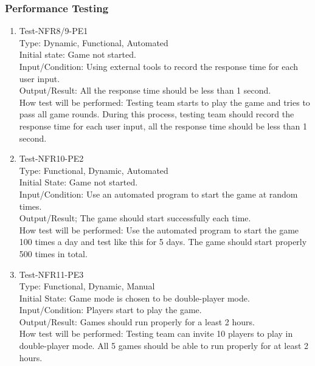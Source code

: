 \documentclass[12pt]{article}
\begin{document}
\subsubsection{Performance Testing}
\begin{enumerate}[1.]
\item Test-NFR8/9-PE1\\
Type: Dynamic, Functional, Automated\\
Initial state: Game not started.\\
Input/Condition: Using external tools to record
 the response time for each user input.\\
Output/Result: All the response time should be 
less than 1 second.\\
How test will be performed: Testing team starts to play
the game and tries to pass all game rounds. During this
process, testing team should record the response time 
for each user input, all the response time should be 
less than 1 second.
\newpage
\item Test-NFR10-PE2\\
Type: Functional, Dynamic, Automated\\
Initial State: Game not started.\\
Input/Condition: Use an automated program to start the
game at random times.\\
Output/Result; The game should start successfully 
each time.\\
How test will be performed: Use the automated program
to start the game 100 times a day and test like this 
for 5 days. The game should start properly 500 times in 
total.
\item Test-NFR11-PE3\\
Type: Functional, Dynamic, Manual\\
Initial State: Game mode is chosen to be double-player
mode.\\
Input/Condition: Players start to play the game.\\
Output/Result: Games should run properly for a least 
2 hours.\\
How test will be performed: Testing team can invite 
10 players to play in double-player mode. All 5 games
should be able to run properly for at least 2 hours.
\end{enumerate}
\end{document}
